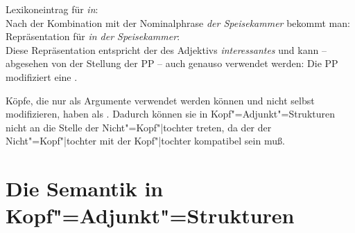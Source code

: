 \ea
Lexikoneintrag für \emph{in}:\\
\z
Nach der Kombination mit der Nominalphrase \emph{der Speisekammer} bekommt man:
\ea
Repräsentation für \emph{in der Speisekammer}:\\
\z
Diese Repräsentation entspricht der des Adjektivs \emph{interessantes} und kann 
-- abgesehen von der Stellung der PP -- auch genauso verwendet
werden: Die PP modifiziert eine \nbar.

Köpfe, die nur als Argumente verwendet werden können und nicht selbst modifizieren,
haben als \modw{} . Dadurch können sie in Kopf"=Adjunkt"=Strukturen nicht an die Stelle
der Nicht"=Kopf"|tochter treten, da der \modw der Nicht"=Kopf"|tochter mit der Kopf"|tochter kompatibel
sein muß.





\section{Die Semantik in Kopf"=Adjunkt"=Strukturen}
\label{sem-adj}

